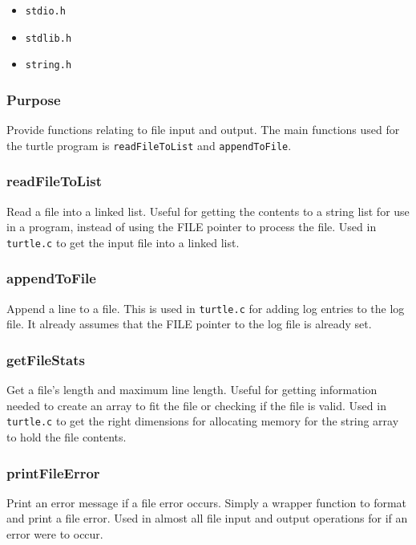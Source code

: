 \documentclass[a4paper, 12pt, titlepage]{article}
\newcommand{\code}[1]{\small\texttt{#1}\normalsize}
\begin{document}
\begin{itemize}[label={--}, noitemsep]
    \item \code{stdio.h}
    \item \code{stdlib.h}
    \item \code{string.h}
\end{itemize}

\subsubsection{Purpose}

Provide functions relating to file input and output. The main functions used
for the turtle program is \code{readFileToList} and \code{appendToFile}.

\subsubsection{readFileToList}

Read a file into a linked list. Useful for getting the contents to a string
list for use in a program, instead of using the FILE pointer to process
the file. Used in \code{turtle.c} to get the input file into a linked list.

\subsubsection{appendToFile}

Append a line to a file. This is used in \code{turtle.c} for adding log
entries to the log file. It already assumes that the FILE pointer to the
log file is already set.

\subsubsection{getFileStats}

Get a file's length and maximum line length. Useful for getting information
needed to create an array to fit the file or checking if the file is valid.
Used in \code{turtle.c} to get the right dimensions for allocating memory
for the string array to hold the file contents.

\subsubsection{printFileError}

Print an error message if a file error occurs. Simply a wrapper function to
format and print a file error. Used in almost all file input and output
operations for if an error were to occur.
\end{document}
